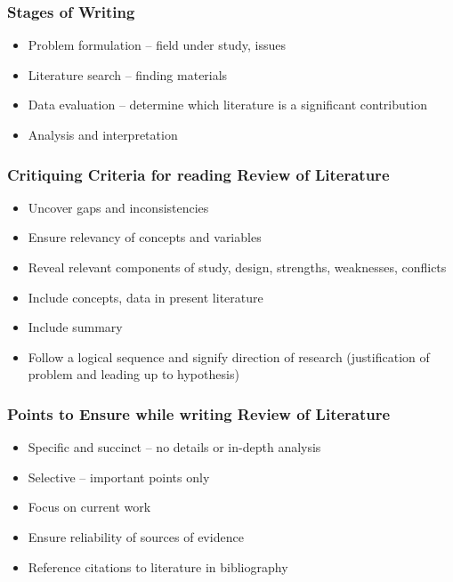 \documentclass{article}
\begin{document}
\subsubsection{Stages of Writing}
\begin{itemize}
    \item Problem formulation -- field under study, issues
    \item Literature search -- finding materials
    \item Data evaluation -- determine which literature is a significant contribution
    \item Analysis and interpretation
\end{itemize}

\subsubsection{Critiquing Criteria for reading Review of Literature}

\begin{itemize}
    \item Uncover gaps and inconsistencies
    \item Ensure relevancy of concepts and variables
    \item Reveal relevant components of study, design, strengths, weaknesses, conflicts
    \item Include concepts, data in present literature
    \item Include summary
    \item Follow a logical sequence and signify direction of research (justification of problem and leading up to hypothesis)
\end{itemize}

\subsubsection{Points to Ensure while writing Review of Literature}

\begin{itemize}
    \item Specific and succinct -- no details or in-depth analysis
    \item Selective -- important points only
    \item Focus on current work
    \item Ensure reliability of sources of evidence
    \item Reference citations to literature in bibliography
    
\end{itemize}
\end{document}
